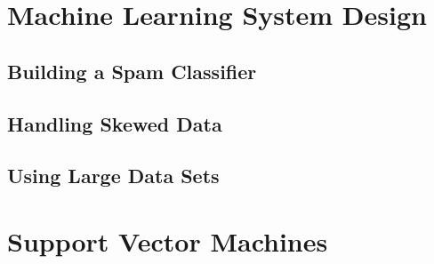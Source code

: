 \documentclass[11pt,a4paper]{article}
\begin{document}
\section{Machine Learning System Design}
    \subsection{Building a Spam Classifier}
    \subsection{Handling Skewed Data}
    \subsection{Using Large Data Sets}







\newpage
\section{Support Vector Machines}











































\citet{Ross15}



\end{document}
